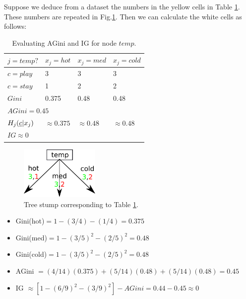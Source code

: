 Suppose we deduce from a dataset
the numbers in the yellow cells
in Table \ref{tab-temp-gini}.
These numbers are repeated in  Fig.\ref{fig-stump-3cildren}.
Then we can calculate the white cells as follows: 

\begin{table}[h!]
\centering
\begin{tabular}{|l|l|l|l|}
\hline
$j=temp?$ & \cellcolor[HTML]{CBCEFB}$x_j=hot$ & \cellcolor[HTML]{CBCEFB}$x_j=med$ & \cellcolor[HTML]{CBCEFB}$x_j=cold$ \\ \hline
\rowcolor[HTML]{FFFFC7} 
\cellcolor[HTML]{9AFF99}$c=play$ & 3 & 3 & 3 \\ \hline
\rowcolor[HTML]{FFFFC7} 
\cellcolor[HTML]{FFCCC9}$c=stay$ & 1 & 2 & 2 \\ \hline
$Gini$ & 0.375 & 0.48 & 0.48 \\ \hline
\multicolumn{4}{|l|}{$AGini=0.45$} \\ \hline
$H_j(\rvc|x_j)$ & $\approx 0.375$ & $\approx 0.48$ & $\approx 0.48$ \\ \hline
\multicolumn{4}{|l|}{$IG\approx 0$} \\ \hline
\end{tabular}
\caption{Evaluating AGini and IG for node $temp$.}
\label{tab-temp-gini}
\end{table}



\begin{figure}[h!]
\centering
\includegraphics[width=1.5in]
{dtree/stump-3children.png}
\caption{Tree stump
corresponding to Table \ref{tab-temp-gini}.}
\label{fig-stump-3cildren}
\end{figure}



\begin{itemize}
\item Gini(hot)$=1-(3/4)-(1/4)=0.375$
\item Gini(med)$=1-(3/5)^2-(2/5)^2=0.48$
\item Gini(cold)$=1-(3/5)^2-(2/5)^2=0.48$
\item AGini $ = (4/14)(0.375)+
(5/14)(0.48) + (5/14)(0.48) = 0.45 $
\item IG $\approx [1 -(6/9)^2-(3/9)^2]-AGini= 
0.44-0.45\approx 0$
\end{itemize}

